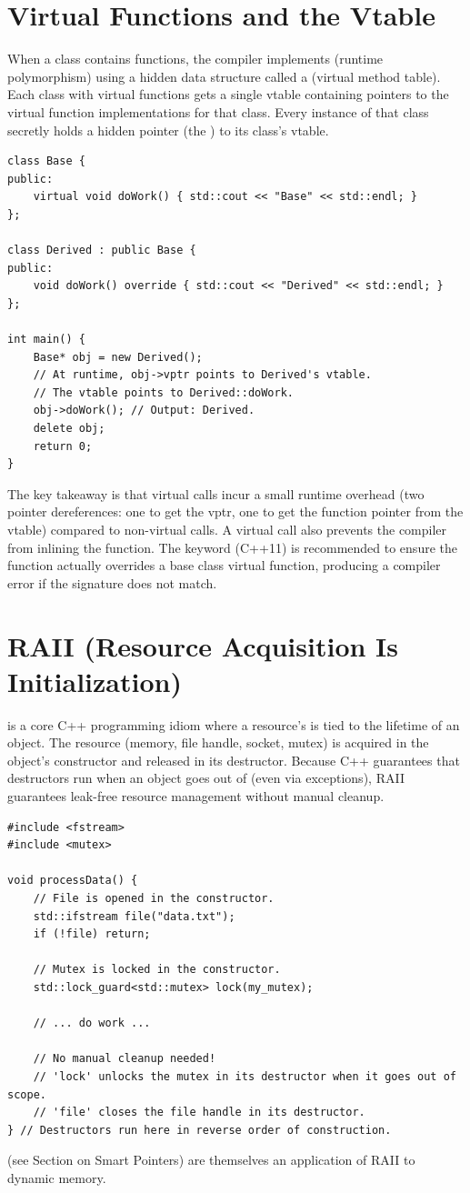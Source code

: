 \section{Virtual Functions and the Vtable}
When a class contains  functions, the compiler implements  (runtime polymorphism) using a hidden data structure called a  (virtual method table). Each class with virtual functions gets a single vtable containing pointers to the virtual function implementations for that class. Every instance of that class secretly holds a hidden pointer (the ) to its class's vtable.
\begin{lstlisting}
class Base {
public:
    virtual void doWork() { std::cout << "Base" << std::endl; }
};

class Derived : public Base {
public:
    void doWork() override { std::cout << "Derived" << std::endl; }
};

int main() {
    Base* obj = new Derived();
    // At runtime, obj->vptr points to Derived's vtable.
    // The vtable points to Derived::doWork.
    obj->doWork(); // Output: Derived.
    delete obj;
    return 0;
}
\end{lstlisting}
The key takeaway is that virtual calls incur a small runtime overhead (two pointer dereferences: one to get the vptr, one to get the function pointer from the vtable) compared to non-virtual calls. A virtual call also prevents the compiler from inlining the function. The  keyword (C++11) is recommended to ensure the function actually overrides a base class virtual function, producing a compiler error if the signature does not match.

\section{RAII (Resource Acquisition Is Initialization)}
 is a core C++ programming idiom where a resource's  is tied to the lifetime of an object. The resource (memory, file handle, socket, mutex) is acquired in the object's constructor and released in its destructor. Because C++ guarantees that destructors run when an object goes out of  (even via exceptions), RAII guarantees leak-free resource management without manual cleanup.
\begin{lstlisting}
#include <fstream>
#include <mutex>

void processData() {
    // File is opened in the constructor.
    std::ifstream file("data.txt");
    if (!file) return;

    // Mutex is locked in the constructor.
    std::lock_guard<std::mutex> lock(my_mutex);

    // ... do work ...

    // No manual cleanup needed!
    // 'lock' unlocks the mutex in its destructor when it goes out of scope.
    // 'file' closes the file handle in its destructor.
} // Destructors run here in reverse order of construction.
\end{lstlisting}
 (see Section on Smart Pointers) are themselves an application of RAII to dynamic memory.



